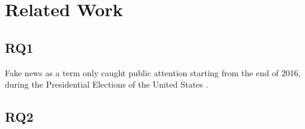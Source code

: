 \section{Related Work}
\label{sec:rel}

\subsection{RQ1}
Fake news as a term only caught public attention starting from the end of 2016, during the Presidential Elections of the United States \cite{googletrends2019}.   

\subsection{RQ2}